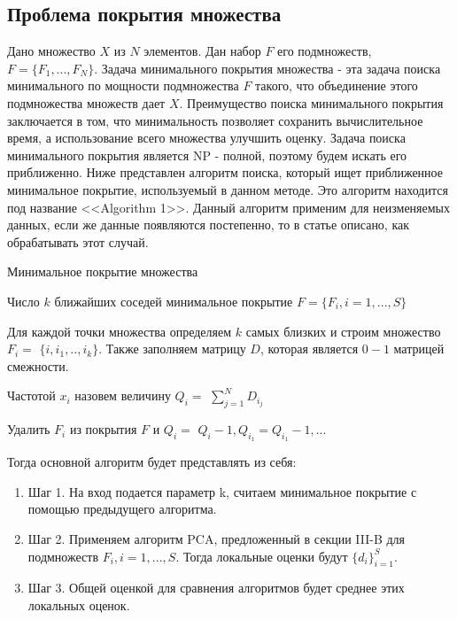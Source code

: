 \documentclass[english, russian]{sobraep}
\begin{document}
\subsection{Проблема покрытия множества}

Дано множество $X$ из $N$ элементов. Дан набор $F$ его подмножеств, $F = \{F_1, ..., F_N\}$. Задача минимального покрытия множества - эта задача поиска минимального по мощности подмножества $F$ такого, что объединение этого подмножества множеств дает $X$.
Преимущество поиска минимального покрытия заключается в том, что минимальность позволяет сохранить вычислительное время, а использование всего множества улучшить оценку. Задача поиска минимального покрытия является NP - полной, поэтому будем искать его приближенно.
Ниже представлен алгоритм поиска, который ищет приближенное минимальное покрытие, используемый в данном методе. Это алгоритм находится под название <<Algorithm 1>>. Данный алгоритм применим для неизменяемых данных, если же данные появляются постепенно, то в статье описано, как обрабатывать этот случай.

\begin{algorithm}
\caption{Минимальное покрытие множества}\label{alg:cap}
\begin{algorithmic}
\Require Число $k$ ближайших соседей
\Ensure минимальное покрытие $F = \{F_i, i = 1, ..., S\}$

    \State Для каждой точки множества определяем $k$
    \State самых близких и строим множество $F_i =$
    \State $\{i, i_1, .., i_k\}$.  Также заполняем
    \State матрицу $D$, которая является $0-1$ матрицей
    \State смежности.
\EndFor

    \State Частотой $x_i$ назовем величину $Q_i = $
    \State $\sum_{j=1}^N D_i_j$
\EndFor

        \State Удалить $F_i$ из покрытия $F$ и $Q_i = $
        \State $Q_i - 1, Q_i_1 = Q_i_1 - 1, ...$
    \EndIf
\EndFor

\end{algorithmic}
\end{algorithm}

Тогда основной алгоритм будет представлять из себя:
\begin{enumerate}
    \item Шаг 1. На вход подается параметр k, считаем минимальное покрытие с помощью предыдущего алгоритма.
    \item Шаг 2. Применяем алгоритм PCA, предложенный в секции III-B для подмножеств $F_i, i = 1, ..., S$. Тогда локальные оценки будут $\{d_i\}_{i=1}^S$.
    \item Шаг 3. Общей оценкой для сравнения алгоритмов будет среднее этих локальных оценок.
\end{enumerate}
\end{document}
